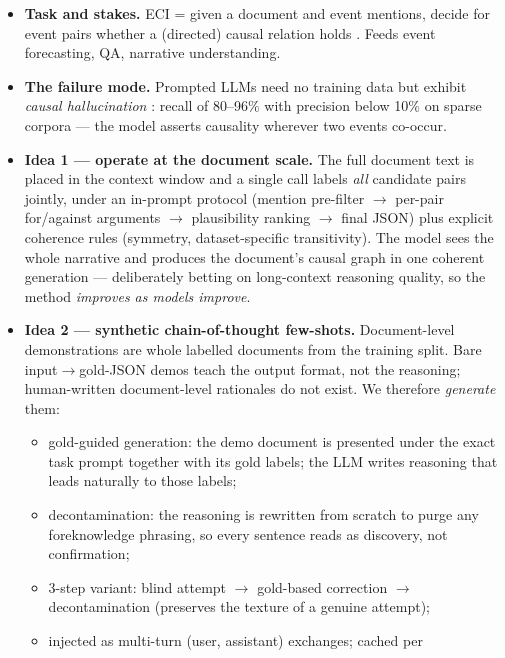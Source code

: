 \documentclass[11pt]{article}
\begin{document}
\begin{itemize}
  \item \textbf{Task and stakes.} ECI = given a document and event mentions, decide for
        event pairs whether a (directed) causal relation holds
        \citep{cheng2025survey}. Feeds event forecasting, QA, narrative understanding.
  \item \textbf{The failure mode.} Prompted LLMs need no training data but
        exhibit \emph{causal hallucination} \citep{gao2023chatgpt}: recall
        of 80--96\% with precision below 10\% on sparse corpora --- the model
        asserts causality wherever two events co-occur.
  \item \textbf{Idea 1 --- operate at the document scale.} The full document
        text is placed in the context window and a single call labels
        \emph{all} candidate pairs jointly, under an in-prompt protocol
        (mention pre-filter $\to$ per-pair for/against arguments $\to$ plausibility
        ranking $\to$ final JSON) plus explicit coherence rules (symmetry,
        dataset-specific transitivity). The model sees the whole narrative and
        produces the document's causal graph in one coherent generation ---
        deliberately betting on long-context reasoning quality, so the method
        \emph{improves as models improve}.
  \item \textbf{Idea 2 --- synthetic chain-of-thought few-shots.} Document-level
        demonstrations are whole labelled documents from the training split.
        Bare input$\to$gold-JSON demos teach the output format, not
        the reasoning; human-written document-level rationales do not exist.
        We therefore \emph{generate} them:
        \begin{itemize}
          \item gold-guided generation: the demo document is presented under the
                exact task prompt together with its gold labels; the LLM writes
                reasoning that leads naturally to those labels;
          \item decontamination: the reasoning is rewritten from scratch to
                purge any foreknowledge phrasing, so every sentence reads as
                discovery, not confirmation;
          \item 3-step variant: blind attempt $\to$ gold-based
                correction $\to$ decontamination (preserves the texture of a
                genuine attempt);
          \item injected as multi-turn (user, assistant) exchanges; cached per

\end{itemize}
\end{itemize}
\end{document}
